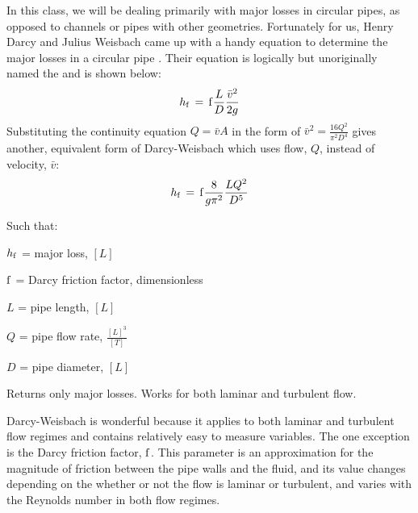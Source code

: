 \documentclass[letterpaper,10pt,english]{sphinxmanual}
\begin{document}
In this class, we will be dealing primarily with major losses in circular pipes, as opposed to channels or pipes with other geometries. Fortunately for us, Henry Darcy and Julius Weisbach came up with a handy equation to determine the major losses in a circular pipe . Their equation is logically but unoriginally named the  and is shown below:
\begin{equation}\label{equation:Fluids_Review/Fluids_Review_Design:Fluids_Review/Fluids_Review_Design:9}
\begin{split}h_{\rm{f}} \, = \, {\rm{f}} \frac{L}{D} \frac{\bar v^2}{2g}\end{split}
\end{equation}
Substituting the continuity equation \(Q = \bar vA\) in the form of \(\bar v^2 = \frac{16Q^2}{\pi^2 D^4}\) gives another, equivalent form of Darcy-Weisbach which uses flow, \(Q\), instead of velocity, \(\bar v\):
\begin{equation}\label{equation:Fluids_Review/Fluids_Review_Design:Fluids_Review/Fluids_Review_Design:10}
\begin{split}h_{\rm{f}} \, = \,{\rm{f}} \frac{8}{g \pi^2} \frac{LQ^2}{D^5}\end{split}
\end{equation}
\begin{DUlineblock}{0em}
\item[] Such that:
\item[] \(h_{\rm{f}}\) = major loss, \([L]\)
\item[] \(\rm{f}\) = Darcy friction factor, dimensionless
\item[] \(L\) = pipe length, \([L]\)
\item[] \(Q\) = pipe flow rate, \(\frac{[L]^3}{[T]}\)
\item[] \(D\) = pipe diameter, \([L]\)
\end{DUlineblock}




  Returns only major losses. Works for both laminar and turbulent flow.



Darcy-Weisbach is wonderful because it applies to both laminar and turbulent flow regimes and contains relatively easy to measure variables. The one exception is the Darcy friction factor, \(\rm{f}\). This parameter is an approximation for the magnitude of friction between the pipe walls and the fluid, and its value changes depending on the whether or not the flow is laminar or turbulent, and varies with the Reynolds number in both flow regimes.
\end{document}
